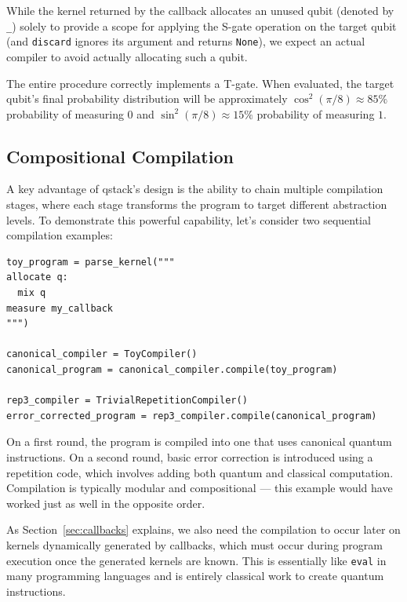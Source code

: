 While the kernel returned by the callback allocates an unused qubit (denoted by \texttt{\_}) solely to provide a scope for applying the S-gate operation on the target qubit (and \texttt{discard} ignores its argument and returns \texttt{None}), we expect an actual compiler to avoid actually allocating such a qubit.

The entire procedure correctly implements a T-gate. When evaluated, the target qubit's final probability distribution will be approximately $\cos^2(\pi/8) \approx 85\%$ probability of measuring $0$ and $\sin^2(\pi/8) \approx 15\%$ probability of measuring $1$.

\subsection{Compositional Compilation}

A key advantage of qstack's design is the ability to chain multiple compilation stages, where each stage transforms the program to target different abstraction levels. To demonstrate this powerful capability, let's consider two sequential compilation examples:

\begin{verbatim}
toy_program = parse_kernel("""
allocate q:
  mix q
measure my_callback
""")

canonical_compiler = ToyCompiler()
canonical_program = canonical_compiler.compile(toy_program)

rep3_compiler = TrivialRepetitionCompiler()
error_corrected_program = rep3_compiler.compile(canonical_program)
\end{verbatim}

On a first round, the program is compiled into one that uses canonical quantum instructions. On a second round, basic error correction is introduced using a repetition code, which involves adding both quantum and classical computation. Compilation is typically modular and compositional --- this example would have worked just as well in the opposite order.

As Section~\ref{sec:callbacks} explains, we also need the compilation to occur later on kernels dynamically generated by callbacks, which must occur during program execution once the generated kernels are known. This is essentially like \verb|eval| in many programming languages and is entirely classical work to create quantum instructions.



